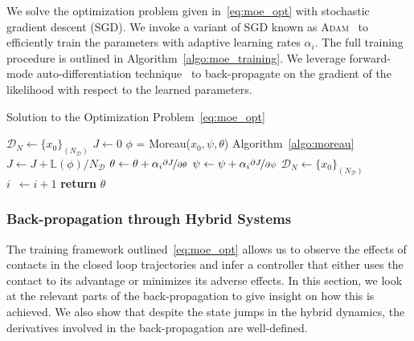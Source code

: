 We solve the optimization problem given in~\eqref{eq:moe_opt} with stochastic
gradient descent (SGD).
%
We invoke a variant of SGD known as \textsc{Adam}~\cite{kingma2014adam} to
efficiently train the parameters with adaptive learning rates $\alpha_i$.
%
The full training procedure is outlined in Algorithm~\eqref{algo:moe_training}.
%
We leverage forward-mode auto-differentiation technique~\cite{revels2016forward}
to back-propagate on the gradient of the likelihood with respect to the learned
parameters.
\begin{algorithm}
      \caption{Solution to the Optimization Problem~\eqref{eq:moe_opt}}
      \label{algo:moe_training}
      \small
      \begin{algorithmic}[1]
          \algrenewcommand\algorithmicindent{0em} %
          \State $\mathcal{D}_N \gets \{x_0\}_{(N_{\mathcal{D}})}$   
          \algrenewcommand\algorithmicindent{1.1em} %
          \State $J \gets 0$
              \State $\phi$ = Moreau($x_0, \psi, \theta$) \Comment Algorithm~\eqref{algo:moreau}
              \State $J \gets J + \mathbb{L}(\phi)/N_{\mathcal{D}}$ 
          \EndFor
          \State $\theta \gets \theta + \alpha_i \nicefrac{\partial J}{\partial \theta}$
          \State $\psi \gets \psi + \alpha_i \nicefrac{\partial J}{\partial \psi}$
          \State $\mathcal{D}_N \gets \{x_0\}_{(N_{\mathcal{D}})}$
          \State $i \;\:\gets i + 1$
          \EndWhile
          \State \textbf{return} $\theta$
      \end{algorithmic}
  \end{algorithm}

\subsubsection{Back-propagation through Hybrid Systems}

The training framework outlined~\eqref{eq:moe_opt} allows us to observe the
effects of contacts in the closed loop trajectories and infer a controller that
either uses the contact to its advantage or minimizes its adverse effects.
%
In this section, we look at the relevant parts of the back-propagation to give
insight on how this is achieved.
%
We also show that despite the state jumps in the hybrid dynamics, the
derivatives involved in the back-propagation are well-defined.

